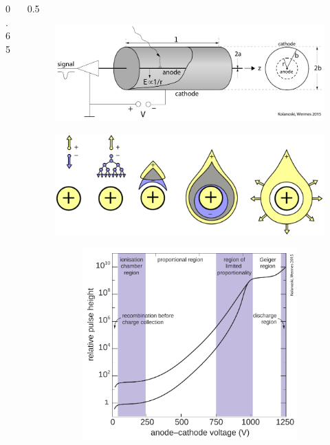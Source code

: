 \documentclass{beamer}
\begin{document}
\begin{frame}
\begin{columns}
\begin{column}{0.65\framewidth}
\begin{itemize}
{                }
            \end{itemize}
        \end{column}
        \begin{column}{0.5\framewidth}
            \begin{figure}[!h]
                \centering
                \includegraphics[width =0.9\columnwidth]{figures/png/Screenshot_20240324_232621.png}
                \label{fig:drifttube}
                \end{figure}
                \begin{figure}[!h]
                    \centering
                    \includegraphics[width =0.9\columnwidth]{figures/png/Screenshot_20240330_182509.png}
                  \label{fig:avalanche}
                  \begin{figure}[!h]
                    \centering
                    \includegraphics[width =0.75\columnwidth]{figures/png/Screenshot_20240330_203416.png}
                    \label{fig:gaseous}
                    \end{figure}
                \end{figure}
        \end{column}
    \end{columns}
\end{frame}
\end{document}
